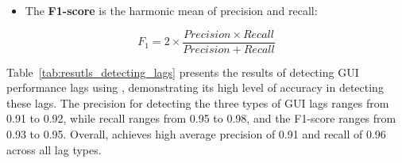 \begin{itemize}
    \item The \textbf{F1-score} is the harmonic mean of precision and recall:
\end{itemize}
\begin{equation}
F_{1} = 2 \times \frac{Precision \times Recall}{Precision + Recall}
\end{equation}


Table~\ref{tab:resutls_detecting_lags} presents the results of detecting GUI performance lags using \tool, demonstrating its high level of accuracy in detecting these lags. The precision for detecting the three types of GUI lags ranges from 0.91 to 0.92, while recall ranges from 0.95 to 0.98, and the F1-score ranges from 0.93 to 0.95. Overall, \tool achieves high average precision of 0.91 and recall of 0.96 across all lag types. 

\begin{table}
	\centering
	\caption{Results of \tool in detecting performance GUI lags across different lag types.}
	\label{tab:resutls_detecting_lags}
        \vspace{-5mm}
\end{table}


